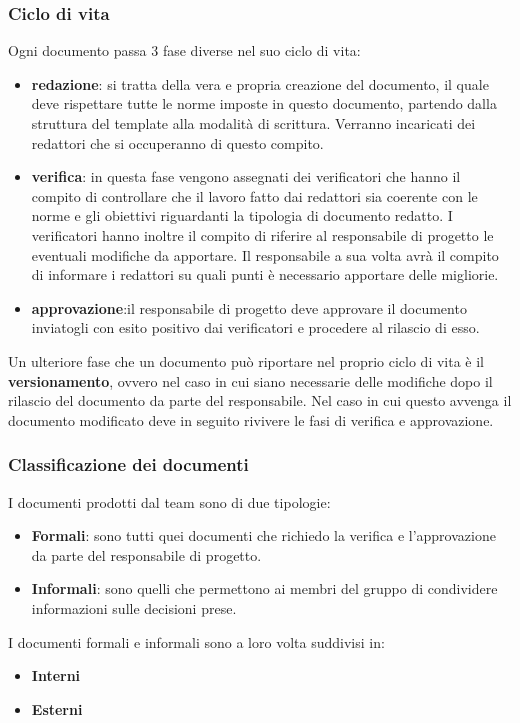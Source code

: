 \subsubsection{Ciclo di vita}
Ogni documento passa 3 fase  diverse nel suo ciclo di vita:
\begin{itemize}
\item\textbf{redazione}: si tratta della vera e propria creazione del documento, il quale deve rispettare tutte le norme imposte in questo documento, partendo dalla struttura del template alla modalità di scrittura. Verranno incaricati dei redattori che si occuperanno di questo compito.
\item\textbf{verifica}: in questa fase vengono assegnati dei verificatori che hanno il compito di controllare che il lavoro fatto dai redattori sia coerente con le norme e gli obiettivi riguardanti la tipologia di documento redatto. I verificatori hanno inoltre il compito di riferire al responsabile di progetto le eventuali modifiche da apportare. Il responsabile a sua volta avrà il compito di informare i redattori su quali punti è necessario apportare delle migliorie. 
\item\textbf{approvazione}:il responsabile di progetto deve approvare il documento inviatogli con esito positivo dai verificatori e procedere al rilascio di esso.
\end{itemize}
Un ulteriore fase che un documento può riportare nel proprio ciclo di vita è il \textbf{versionamento}, ovvero nel caso in cui siano necessarie delle modifiche dopo il rilascio del documento da parte del responsabile. Nel caso in cui questo avvenga il documento modificato deve in seguito rivivere le fasi di verifica e approvazione.


\subsubsection{Classificazione dei documenti}
I documenti prodotti dal team sono di due tipologie:
\begin{itemize}
\item\textbf{Formali}: sono tutti quei documenti che richiedo la verifica e l'approvazione da parte del responsabile di progetto. 
\item\textbf{Informali}: sono quelli che permettono ai membri del gruppo di condividere informazioni sulle decisioni prese.
\end{itemize}
I documenti formali e informali sono a loro volta suddivisi in:
\begin{itemize}
\item\textbf{Interni}
\item\textbf{Esterni}
\end{itemize}

